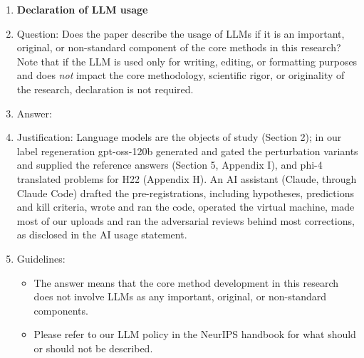 \begin{enumerate}
\item {\bf Declaration of LLM usage}
    \item[] Question: Does the paper describe the usage of LLMs if it is an important, original, or non-standard component of the core methods in this research? Note that if the LLM is used only for writing, editing, or formatting purposes and does \emph{not} impact the core methodology, scientific rigor, or originality of the research, declaration is not required.
    \item[] Answer: \answerYes{}
    \item[] Justification: Language models are the objects of study (Section 2); in our label regeneration gpt-oss-120b generated and gated the perturbation variants and supplied the reference answers (Section 5, Appendix I), and phi-4 translated problems for H22 (Appendix H). An AI assistant (Claude, through Claude Code) drafted the pre-registrations, including hypotheses, predictions and kill criteria, wrote and ran the code, operated the virtual machine, made most of our uploads and ran the adversarial reviews behind most corrections, as disclosed in the AI usage statement.
    \item[] Guidelines:
    \begin{itemize}
        \item The answer \answerNA{} means that the core method development in this research does not involve LLMs as any important, original, or non-standard components.
        \item Please refer to our LLM policy in the NeurIPS handbook for what should or should not be described.
    \end{itemize}

\end{enumerate}